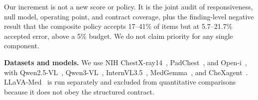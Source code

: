Our increment is not a new score or policy. It is the joint audit of responsiveness, null model, operating point, and contract coverage, plus the finding-level negative result that the composite policy accepts 17--41\% of items but at 5.7--21.7\% accepted error, above a 5\% budget. We do not claim priority for any single component.

\textbf{Datasets and models.} We use NIH ChestX-ray14~\citep{wang2017chestxray8}, PadChest~\citep{bustos2020padchest}, and Open-i~\citep{demnerfushman2016openi}, with Qwen2.5-VL~\citep{bai2025qwen25vl}, Qwen3-VL~\citep{qwen2025qwen3vl}, InternVL3.5~\citep{opengvlab2025internvl35}, MedGemma~\citep{sellergren2025medgemma}, and CheXagent~\citep{chen2024chexagent}. LLaVA-Med~\citep{li2024llavamed} is run separately and excluded from quantitative comparisons because it does not obey the structured contract.
